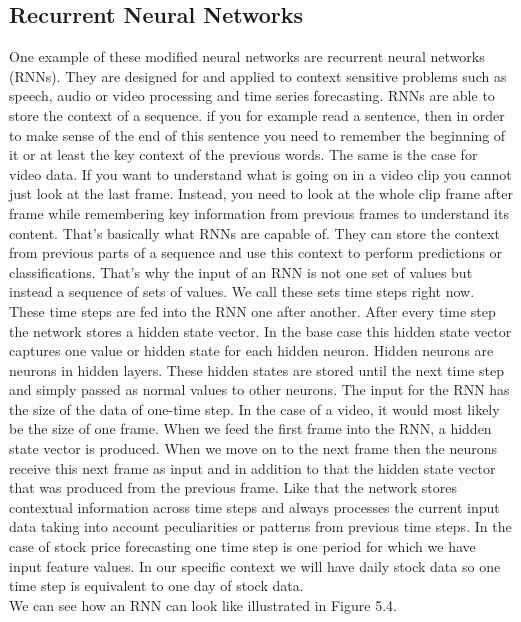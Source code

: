 \documentclass[a4paper,12pt]{report}
\begin{document}
	\subsection{Recurrent Neural Networks}
	One example of these modified neural networks are recurrent neural networks (RNNs). They are designed for and applied to context sensitive problems such as speech, audio or video processing and time series forecasting. RNNs are able to store the context of a sequence. if you for example read a sentence, then in order to make sense of the end of this sentence you need to remember the beginning of it or at least the key context of the previous words. The same is the case for video data. If you want to understand what is going on in a video clip you cannot just look at the last frame. Instead, you need to look at the whole clip frame after frame while remembering key information from previous frames to understand its content. That’s basically what RNNs are capable of. They can store the context from previous parts of a sequence and use this context to perform predictions or classifications. That’s why the input of an RNN is not one set of values but instead a sequence of sets of values. We call these sets time steps right now. These time steps are fed into the RNN one after another. After every time step the network stores a hidden state vector. In the base case this hidden state vector captures one value or hidden state for each hidden neuron. Hidden neurons are neurons in hidden layers. These hidden states are stored until the next time step and simply passed as normal values to other neurons. The input for the RNN has the size of the data of one-time step. In the case of a video, it would most likely be the size of one frame. When we feed the first frame into the RNN, a hidden state vector is produced. When we move on to the next frame then the neurons receive this next frame as input and in addition to that the hidden state vector that was produced from the previous frame. Like that the network stores contextual information across time steps and always processes the current input data taking into account peculiarities or patterns from previous time steps. In the case of stock price forecasting one time step is one period for which we have input feature values. In our specific context we will have daily stock data so one time step is equivalent to one day of stock data.\\
	We can see how an RNN can look like illustrated in Figure 5.4. 
	
\end{document}
